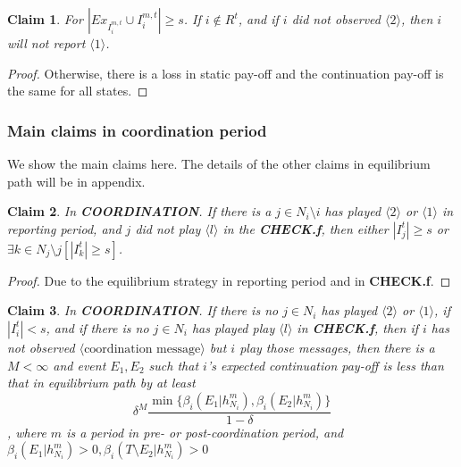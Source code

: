 \documentclass[12pt]{article}
\newtheorem{claim}{Claim}[subsubsection]
\theoremstyle{remark}
\theoremstyle{remark}
\begin{document}
\begin{claim}
For $|Ex_{I^{m,t}_i}\cup I^{m,t}_i|\geq s$. If $i\notin R^{t}$, and if $i$ did not observed $\langle 2 \rangle$, then $i$ will not report $\langle 1 \rangle$.
\end{claim}
\begin{proof}

Otherwise, there is a loss in static pay-off and the continuation pay-off is the same for all states.

\end{proof}

\subsubsection{Main claims in coordination period}

We show the main claims here. The details of the other claims in equilibrium path will be in appendix.




\begin{claim}
\label{claim_must_success}
In \textbf{COORDINATION}. If there is a $j\in N_i\setminus i$ has played $\langle 2 \rangle$ or $\langle 1 \rangle$ in reporting period, and $j$ did not play $\langle l \rangle$ in the \textbf{CHECK.f}, then either $|I^t_j|\geq s$ or $\exists k\in N_j\setminus j[|I^t_k|\geq s]$.
\end{claim}
\begin{proof}

Due to the equilibrium strategy in reporting period and in \textbf{CHECK.f}. 

\end{proof}




\begin{claim} 
\label{claim_report_with_no_message_coordination_period}
In \textbf{COORDINATION}. If there is no $j\in N_i$ has played $\langle 2 \rangle$ or $\langle 1 \rangle$, if $|I^t_i|<s$, and if there is no $j\in N_i$ has played play $\langle l \rangle$ in \textbf{CHECK.f}, then if $i$ has not observed $\langle \text{coordination message} \rangle$ but $i$ play those messages, then there is a $M<\infty$ and event $E_1,E_2$ such that $i$'s expected continuation pay-off is less than that in equilibrium path by at least 
\[\delta^{M}\frac{\min\{\beta_{i}(E_1|h^{m}_{N_i}),\beta_{i}(E_2|h^{m}_{N_i})\}}{1-\delta}\]
, where $m$ is a period in pre- or post-coordination period, and $\beta_{i}(E_1|h^{m}_{N_i})>0,\beta_{i}(T\setminus E_2|h^{m}_{N_i})>0$
\end{claim}
\end{document}
